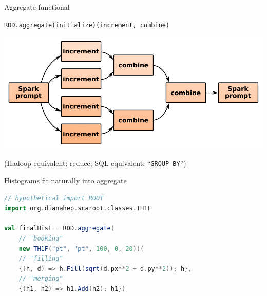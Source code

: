 \documentclass{beamer}
\begin{document}
\begin{frame}{Aggregate functional}

\begin{center}
\tt \small RDD.aggregate(initialize)(increment, combine)
\end{center}

\vfill
\includegraphics[width=\linewidth]{aggregate.pdf}

\vfill
(Hadoop equivalent: reduce; \hspace{0.25 cm} SQL equivalent: ``{\tt GROUP BY}'')
\end{frame}

\begin{frame}[fragile]{Histograms fit naturally into aggregate}

\begin{lstlisting}[language=scala]
// hypothetical import ROOT
import org.dianahep.scaroot.classes.TH1F

val finalHist = RDD.aggregate(
    // "booking"
    new TH1F("pt", "pt", 100, 0, 20))(
    // "filling"
    {(h, d) => h.Fill(sqrt(d.px**2 + d.py**2)); h},
    // "merging"
    {(h1, h2) => h1.Add(h2); h1})
\end{lstlisting}

\end{frame}
\end{document}
